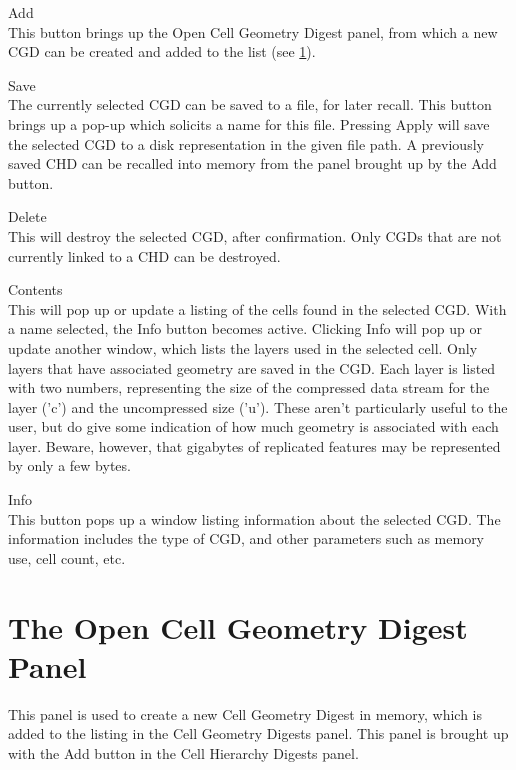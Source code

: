 \begin{description}
\item{\cb Add}\\
This button brings up the {\cb Open Cell Geometry Digest} panel, from
which a new CGD can be created and added to the list (see \ref{cgdadd}).

\item{\cb Save}\\
The currently selected CGD can be saved to a file, for later recall. 
This button brings up a pop-up which solicits a name for this file. 
Pressing {\cb Apply} will save the selected CGD to a disk
representation in the given file path.  A previously saved CHD can be
recalled into memory from the panel brought up by the {\cb Add}
button.

\item{\cb Delete}\\
This will destroy the selected CGD, after confirmation.  Only CGDs
that are not currently linked to a CHD can be destroyed.

\item{\cb Contents}\\
This will pop up or update a listing of the cells found in the
selected CGD.  With a name selected, the {\cb Info} button becomes
active.  Clicking {\cb Info} will pop up or update another window,
which lists the layers used in the selected cell.  Only layers that
have associated geometry are saved in the CGD.  Each layer is listed
with two numbers, representing the size of the compressed data stream
for the layer ('c') and the uncompressed size ('u').  These aren't
particularly useful to the user, but do give some indication of how
much geometry is associated with each layer.  Beware, however, that
gigabytes of replicated features may be represented by only a few
bytes.

\item{\cb Info}\\
This button pops up a window listing information about the 
selected CGD.  The information includes the type of CGD, and other
parameters such as memory use, cell count, etc.
\end{description}

\section{The {\cb Open Cell Geometry Digest} Panel}
\label{cgdadd}
This panel is used to create a new {\cb Cell Geometry Digest} in
memory, which is added to the listing in the {\cb Cell Geometry
Digests} panel.  This panel is brought up with the {\cb Add} button in
the {\cb Cell Hierarchy Digests} panel.

